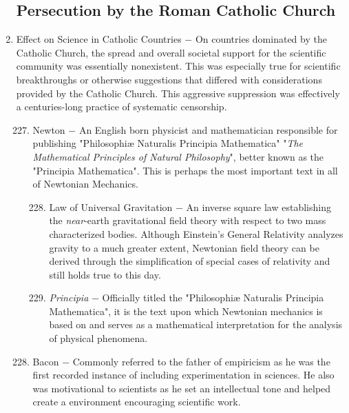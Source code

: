 \documentclass[12pt]{article}
\begin{document}
\begin{enumerate}
\subsection{Persecution by the Roman Catholic Church}

\item Effect on Science in Catholic Countries $-$ On countries dominated by the Catholic Church, the spread and overall societal support for the scientific community was essentially nonexistent. This was especially true for scientific breakthroughs or otherwise suggestions that differed with considerations provided by the Catholic Church. This aggressive suppression was effectively a centuries-long practice of systematic censorship.

 
\begin{enumerate}[label=\arabic{*}.]
\setcounter{enumii}{226}

\item Newton $-$ An English born physicist and mathematician responsible for publishing "Philosophiæ Naturalis Principia Mathematica" "\textit{The Mathematical Principles of Natural Philosophy}",  better known as the "Principia Mathematica". This is perhaps the most important text in all of Newtonian Mechanics.

\begin{enumerate}[label=\arabic{*}.]
\setcounter{enumiii}{227}

\item Law of Universal Gravitation $-$ An inverse square law establishing the \textit{near}-earth gravitational field theory with respect to two mass characterized bodies. Although Einstein's General Relativity analyzes gravity to a much greater extent, Newtonian field theory can be derived through the simplification of special cases of relativity and still holds true to this day.

\item \textit{Principia} $-$ Officially titled the "Philosophiæ Naturalis Principia Mathematica", it is the text upon which Newtonian mechanics is based on and serves as a mathematical interpretation for the analysis of physical phenomena.

\end{enumerate}
\setcounter{enumii}{229}

\item Bacon $-$ Commonly referred to the father of empiricism as he was the first recorded instance of including experimentation in sciences. He also was motivational to scientists as he set an intellectual tone and helped create a environment encouraging scientific work.


\end{enumerate}
\end{enumerate}
\end{document}
